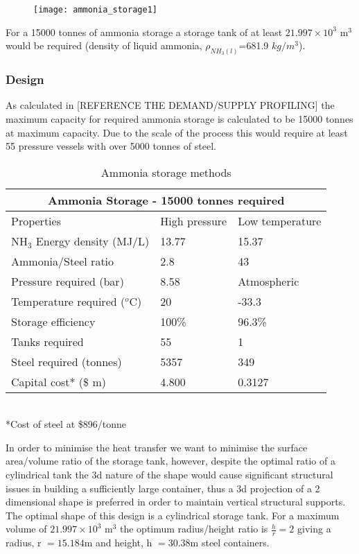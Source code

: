 {{\begin{figure}[h]
	\centering
	
	\texttt{[image: ammonia\_storage1]}
\end{figure}
}
For a 15000 tonnes of ammonia storage a storage tank of at least $21.997\times10^3$ m$^3$ would be required (density of liquid ammonia, $\rho_{NH_3(l)}$=681.9 $kg/m^3$)\cite{Hacker2003}. 
\subsubsection{Design}
As calculated in [REFERENCE THE DEMAND/SUPPLY PROFILING] the maximum capacity for required ammonia storage is calculated to be 15000 tonnes at maximum capacity. Due to the scale of the process this would require at least 55 pressure vessels with over 5000 tonnes of steel.

\begin{table}[!htbp]
	\begin{center}
	\caption{Ammonia storage methods}
\begin{tabular}{ |p{5cm}||p{3cm}||p{3cm}|| }
	\hline
	\multicolumn{3}{|c|}{Ammonia Storage - 15000 tonnes required } \\
	\hline

	Properties & High pressure& Low temperature\\
	\hline
	NH$_3$ Energy density (MJ/L) & 13.77& 15.37\\
	Ammonia/Steel ratio & 2.8& 43\\
	Pressure required (bar) & 8.58 &Atmospheric\\
	Temperature required ($^o$C)& 20 &-33.3\\
	Storage efficiency&100\%&96.3\% \\
	
	Tanks required   &55&1 \\
	Steel required (tonnes)   &5357&349 \\
	Capital cost* (\$ m)   &4.800&0.3127 \\
	
	
	\hline
\end{tabular}
\\
{\small
	*Cost of steel at \$896/tonne \cite{Meps2018}}
\end{center}

\end{table}


In order to minimise the heat transfer we want to minimise the surface area/volume ratio of the storage tank, however, despite the optimal ratio of a cylindrical tank the 3d nature of the shape would cause significant structural issues in building a sufficiently large container, thus a 3d projection of a 2 dimensional shape is preferred in order to maintain vertical structural supports. The optimal shape of this design is a cylindrical storage tank. For a maximum volume of $21.997\times10^3$ m$^3$ the optimum radius/height ratio is $\frac{h}{r} = 2$ giving a radius, r $ = 15.184$m and height, h $ = 30.38$m steel containers.

}
